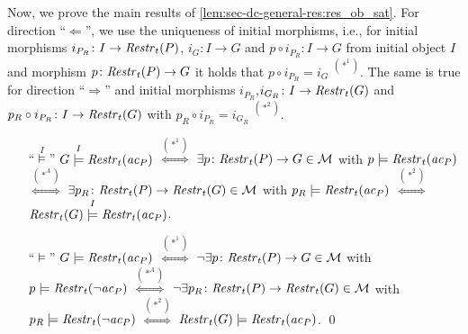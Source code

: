 Now, we prove the main results of \cref{lem:sec-dc-general-res:res_ob_sat}.
For direction ``$\Leftarrow$'', we use the uniqueness of initial morphisms, i.e., for initial morphisms $i_{P_R}\colon I \to \mathit{Restr}_t(P)$, $i_G\colon I \to G$ and $p \circ i_{P_R}\colon I \to G$ from initial object $I$ and morphism $p\colon \mathit{Restr}_t(P) \to G$ it holds that $p \circ i_{P_R}=i_G$ $^{(*^1)}$.
The same is true for direction ``$\Rightarrow$'' and initial morphisms $i_{P_R}$,$i_{G_R}\colon I \to \mathit{Restr}_t(G)$ and $p_R \circ i_{P_R}\colon I \to \mathit{Restr}_t(G)$ with $p_R \circ i_{P_R}=i_{G_R}$ $^{(*^2)}$.\thispagestyle{plain}
\begin{enumerate}
  \item[``$\stackrel{I}{\models}$''] $G \stackrel{I}{\models} \mathit{Restr}_t(\mathit{ac}_P)$ $\stackrel{(*^1)}{\Leftrightarrow}$ $\exists p\colon \mathit{Restr}_t(P) \to G \in {\cal M}$ with $p \models \mathit{Restr}_t(\mathit{ac}_P)$ $\stackrel{(*^A)}{\Leftrightarrow}$ $\exists p_R\colon \mathit{Restr}_t(P) \to \mathit{Restr}_t(G) \in {\cal M}$ with $p_R \models \mathit{Restr}_t(\mathit{ac}_P)$ $\stackrel{(*^2)}{\Leftrightarrow}$ $\mathit{Restr}_t(G) \stackrel{I}{\models} \mathit{Restr}_t(\mathit{ac}_P)$.
  \item[``$\models$''] $G \models \mathit{Restr}_t(\mathit{ac}_P)$ $\stackrel{(*^1)}{\Leftrightarrow}$ $\neg\exists p\colon \mathit{Restr}_t(P) \to G \in {\cal M}$ with $p \models \mathit{Restr}_t(\neg\mathit{ac}_P)$ $\stackrel{(*^A)}{\Leftrightarrow}$ $\neg\exists p_R\colon \mathit{Restr}_t(P) \to \mathit{Restr}_t(G) \in {\cal M}$ with $p_R \models \mathit{Restr}_t(\neg\mathit{ac}_P)$ $\stackrel{(*^2)}{\Leftrightarrow}$ $\mathit{Restr}_t(G) \models \mathit{Restr}_t(\mathit{ac}_P)$.
  \qed
\end{enumerate}

